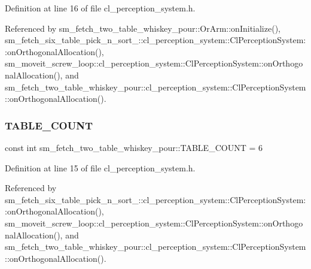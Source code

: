 Definition at line 16 of file cl\+\_\+perception\+\_\+system.\+h.



Referenced by sm\+\_\+fetch\+\_\+two\+\_\+table\+\_\+whiskey\+\_\+pour\+::\+Or\+Arm\+::on\+Initialize(), sm\+\_\+fetch\+\_\+six\+\_\+table\+\_\+pick\+\_\+n\+\_\+sort\+\_\+::cl\+\_\+perception\+\_\+system\+::\+Cl\+Perception\+System\+::on\+Orthogonal\+Allocation(), sm\+\_\+moveit\+\_\+screw\+\_\+loop\+::cl\+\_\+perception\+\_\+system\+::\+Cl\+Perception\+System\+::on\+Orthogonal\+Allocation(), and sm\+\_\+fetch\+\_\+two\+\_\+table\+\_\+whiskey\+\_\+pour\+::cl\+\_\+perception\+\_\+system\+::\+Cl\+Perception\+System\+::on\+Orthogonal\+Allocation().

\mbox{\label{namespacesm__fetch__two__table__whiskey__pour_a17b0c4eed9dc45b1cdf81aeb8cab3fda}} 
\subsubsection{\texorpdfstring{T\+A\+B\+L\+E\+\_\+\+C\+O\+U\+NT}{TABLE\_COUNT}}
{\footnotesize\ttfamily const int sm\+\_\+fetch\+\_\+two\+\_\+table\+\_\+whiskey\+\_\+pour\+::\+T\+A\+B\+L\+E\+\_\+\+C\+O\+U\+NT = 6}



Definition at line 15 of file cl\+\_\+perception\+\_\+system.\+h.



Referenced by sm\+\_\+fetch\+\_\+six\+\_\+table\+\_\+pick\+\_\+n\+\_\+sort\+\_\+::cl\+\_\+perception\+\_\+system\+::\+Cl\+Perception\+System\+::on\+Orthogonal\+Allocation(), sm\+\_\+moveit\+\_\+screw\+\_\+loop\+::cl\+\_\+perception\+\_\+system\+::\+Cl\+Perception\+System\+::on\+Orthogonal\+Allocation(), and sm\+\_\+fetch\+\_\+two\+\_\+table\+\_\+whiskey\+\_\+pour\+::cl\+\_\+perception\+\_\+system\+::\+Cl\+Perception\+System\+::on\+Orthogonal\+Allocation().

